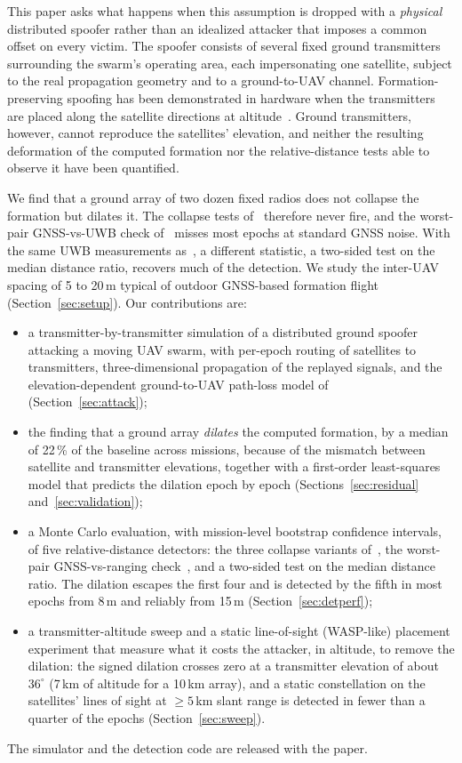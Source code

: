 \documentclass[conference]{IEEEtran}
\begin{document}
This paper asks what happens when this assumption is dropped with a
\emph{physical} distributed spoofer rather than an idealized attacker
that imposes a common offset on every victim. The spoofer consists of
several fixed ground transmitters surrounding the swarm's operating
area, each impersonating one satellite, subject to the real propagation
geometry and to a ground-to-UAV channel. Formation-preserving spoofing
has been demonstrated in hardware when the transmitters are placed along
the satellite directions at altitude~\cite{tibaldo2025gnsswasp}. Ground
transmitters, however, cannot reproduce the satellites' elevation, and
neither the resulting deformation of the computed formation nor the
relative-distance tests able to observe it have been quantified.

We find that a ground array of two dozen fixed radios does not collapse
the formation but dilates it. The collapse tests
of~\cite{jansen2016multireceiver} therefore never fire, and the
worst-pair GNSS-vs-UWB check of~\cite{mykytyn2023uwb} misses most epochs
at standard GNSS noise. With the same UWB measurements
as~\cite{mykytyn2023uwb}, a different statistic, a two-sided test on the
median distance ratio, recovers much of the detection. We study the
inter-UAV spacing of 5 to 20\,m typical of outdoor GNSS-based formation
flight (Section~\ref{sec:setup}). Our contributions are:
\begin{itemize}
\item a transmitter-by-transmitter simulation of a distributed ground
  spoofer attacking a moving UAV swarm, with per-epoch routing of
  satellites to transmitters, three-dimensional propagation of the
  replayed signals, and the elevation-dependent ground-to-UAV path-loss
  model of~\cite{alhourani2018cellular} (Section~\ref{sec:attack});
\item the finding that a ground array \emph{dilates} the computed
  formation, by a median of 22\,\% of the baseline across missions,
  because of the mismatch between satellite and transmitter elevations,
  together with a first-order least-squares model that predicts the
  dilation epoch by epoch (Sections~\ref{sec:residual}
  and~\ref{sec:validation});
\item a Monte Carlo evaluation, with mission-level bootstrap confidence
  intervals, of five relative-distance detectors: the three collapse
  variants of~\cite{jansen2016multireceiver}, the worst-pair
  GNSS-vs-ranging check~\cite{mykytyn2023uwb}, and a two-sided test on
  the median distance ratio. The dilation escapes the first four and is
  detected by the fifth in most epochs from 8\,m and reliably from 15\,m
  (Section~\ref{sec:detperf});
\item a transmitter-altitude sweep and a static line-of-sight
  (WASP-like) placement experiment that measure what it costs the
  attacker, in altitude, to remove the dilation: the signed dilation
  crosses zero at a transmitter elevation of about $36^\circ$ (7\,km of
  altitude for a 10\,km array), and a static constellation on the
  satellites' lines of sight at $\ge5$\,km slant range is detected in
  fewer than a quarter of the epochs (Section~\ref{sec:sweep}).
\end{itemize}
The simulator and the detection code are released with the paper.
\end{document}
